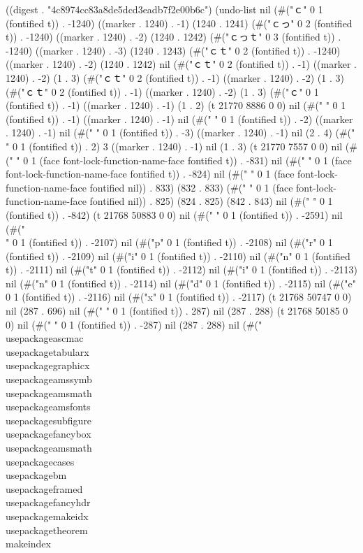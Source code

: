 
((digest . "4c8974cc83a8de5dcd3eadb7f2e00b6c") (undo-list nil (#("ｃ" 0 1 (fontified t)) . -1240) ((marker . 1240) . -1) (1240 . 1241) (#("ｃっ" 0 2 (fontified t)) . -1240) ((marker . 1240) . -2) (1240 . 1242) (#("ｃっｔ" 0 3 (fontified t)) . -1240) ((marker . 1240) . -3) (1240 . 1243) (#("ｃｔ" 0 2 (fontified t)) . -1240) ((marker . 1240) . -2) (1240 . 1242) nil (#("ｃｔ" 0 2 (fontified t)) . -1) ((marker . 1240) . -2) (1 . 3) (#("ｃｔ" 0 2 (fontified t)) . -1) ((marker . 1240) . -2) (1 . 3) (#("ｃｔ" 0 2 (fontified t)) . -1) ((marker . 1240) . -2) (1 . 3) (#("ｃ" 0 1 (fontified t)) . -1) ((marker . 1240) . -1) (1 . 2) (t 21770 8886 0 0) nil (#("
" 0 1 (fontified t)) . -1) ((marker . 1240) . -1) nil (#("
" 0 1 (fontified t)) . -2) ((marker . 1240) . -1) nil (#("	" 0 1 (fontified t)) . -3) ((marker . 1240) . -1) nil (2 . 4) (#("	" 0 1 (fontified t)) . 2) 3 ((marker . 1240) . -1) nil (1 . 3) (t 21770 7557 0 0) nil (#("
" 0 1 (face font-lock-function-name-face fontified t)) . -831) nil (#("
" 0 1 (face font-lock-function-name-face fontified t)) . -824) nil (#(" " 0 1 (face font-lock-function-name-face fontified nil)) . 833) (832 . 833) (#(" " 0 1 (face font-lock-function-name-face fontified nil)) . 825) (824 . 825) (842 . 843) nil (#("
" 0 1 (fontified t)) . -842) (t 21768 50883 0 0) nil (#(" " 0 1 (fontified t)) . -2591) nil (#("\\" 0 1 (fontified t)) . -2107) nil (#("p" 0 1 (fontified t)) . -2108) nil (#("r" 0 1 (fontified t)) . -2109) nil (#("i" 0 1 (fontified t)) . -2110) nil (#("n" 0 1 (fontified t)) . -2111) nil (#("t" 0 1 (fontified t)) . -2112) nil (#("i" 0 1 (fontified t)) . -2113) nil (#("n" 0 1 (fontified t)) . -2114) nil (#("d" 0 1 (fontified t)) . -2115) nil (#("e" 0 1 (fontified t)) . -2116) nil (#("x" 0 1 (fontified t)) . -2117) (t 21768 50747 0 0) nil (287 . 696) nil (#("
" 0 1 (fontified t)) . 287) nil (287 . 288) (t 21768 50185 0 0) nil (#("
" 0 1 (fontified t)) . -287) nil (287 . 288) nil (#("\\usepackage{ascmac}
\\usepackage{tabularx}
\\usepackage{graphicx}
\\usepackage{amssymb}
\\usepackage{amsmath}
\\usepackage{amsfonts}
\\usepackage{subfigure}
\\usepackage{fancybox} 
\\usepackage{amsmath}
\\usepackage{cases}
\\usepackage{bm}
\\usepackage{framed}
\\usepackage{fancyhdr}
\\usepackage{makeidx}
\\usepackage{theorem}
\\makeindex


